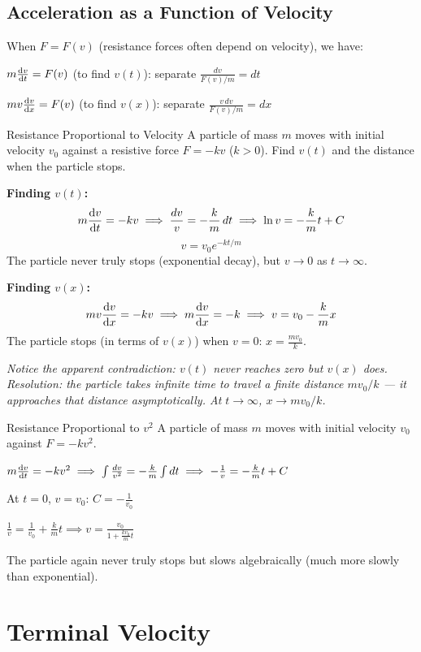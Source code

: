 \documentclass[12pt, a4paper]{book}
\begin{document}
\subsection{Acceleration as a Function of Velocity}

When $F = F(v)$ (resistance forces often depend on velocity), we have:

$m\dv{v}{t} = F(v)$ (to find $v(t)$): separate $\frac{dv}{F(v)/m} = dt$

$mv\dv{v}{x} = F(v)$ (to find $v(x)$): separate $\frac{v\,dv}{F(v)/m} = dx$

\begin{exmp}{Resistance Proportional to Velocity}{}
A particle of mass $m$ moves with initial velocity $v_0$ against a resistive force $F = -kv$ ($k > 0$). Find $v(t)$ and the distance when the particle stops.

\medskip
\textbf{Finding $v(t)$:}
\[
  m\dv{v}{t} = -kv \implies \frac{dv}{v} = -\frac{k}{m}\,dt \implies \ln v = -\frac{k}{m}t + C
\]
\[
  v = v_0 e^{-kt/m}
\]
The particle never truly stops (exponential decay), but $v \to 0$ as $t \to \infty$.

\textbf{Finding $v(x)$:}
\[
  mv\dv{v}{x} = -kv \implies m\dv{v}{x} = -k \implies v = v_0 - \frac{k}{m}x
\]
The particle stops (in terms of $v(x)$) when $v = 0$: $x = \frac{mv_0}{k}$.

\textit{Notice the apparent contradiction: $v(t)$ never reaches zero but $v(x)$ does. Resolution: the particle takes infinite time to travel a finite distance $mv_0/k$ --- it approaches that distance asymptotically. At $t \to \infty$, $x \to mv_0/k$.}
\end{exmp}

\begin{exmp}{Resistance Proportional to $v^2$}{}
A particle of mass $m$ moves with initial velocity $v_0$ against $F = -kv^2$.

$m\dv{v}{t} = -kv^2 \implies \int \frac{dv}{v^2} = -\frac{k}{m}\int dt \implies -\frac{1}{v} = -\frac{k}{m}t + C$

At $t=0$, $v = v_0$: $C = -\frac{1}{v_0}$

$\frac{1}{v} = \frac{1}{v_0} + \frac{k}{m}t \implies v = \frac{v_0}{1 + \frac{kv_0}{m}t}$

The particle again never truly stops but slows algebraically (much more slowly than exponential).
\end{exmp}

\section{Terminal Velocity}
\end{document}
